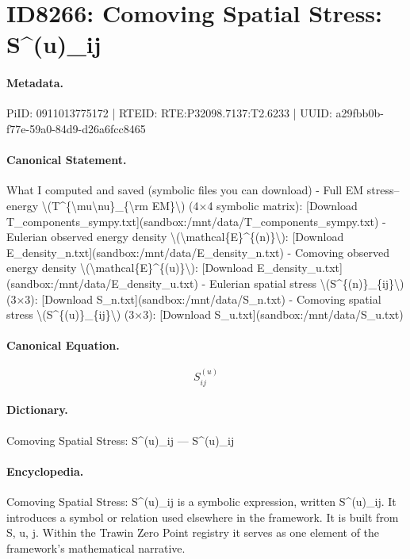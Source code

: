 \section*{ID8266: Comoving Spatial Stress: S\textasciicircum{}(u)\_ij}
\paragraph{Metadata.}
PiID: 0911013775172 | RTEID: RTE:P32098.7137:T2.6233 | UUID: a29fbb0b-f77e-59a0-84d9-d26a6fcc8465

\paragraph{Canonical Statement.}
What I computed and saved (symbolic files you can download) - Full EM stress–energy \textbackslash{}(T\textasciicircum{}\{\textbackslash{}mu\textbackslash{}nu\}\_\{\textbackslash{}rm EM\}\textbackslash{}) (4×4 symbolic matrix): [Download T\_components\_sympy.txt](sandbox:/mnt/data/T\_components\_sympy.txt) - Eulerian observed energy density \textbackslash{}(\textbackslash{}mathcal\{E\}\textasciicircum{}\{(n)\}\textbackslash{}): [Download E\_density\_n.txt](sandbox:/mnt/data/E\_density\_n.txt) - Comoving observed energy density \textbackslash{}(\textbackslash{}mathcal\{E\}\textasciicircum{}\{(u)\}\textbackslash{}): [Download E\_density\_u.txt](sandbox:/mnt/data/E\_density\_u.txt) - Eulerian spatial stress \textbackslash{}(S\textasciicircum{}\{(n)\}\_\{ij\}\textbackslash{}) (3×3): [Download S\_n.txt](sandbox:/mnt/data/S\_n.txt) - Comoving spatial stress \textbackslash{}(S\textasciicircum{}\{(u)\}\_\{ij\}\textbackslash{}) (3×3): [Download S\_u.txt](sandbox:/mnt/data/S\_u.txt)

\paragraph{Canonical Equation.}
\[
S^{(u)}_{ij}
\]

\paragraph{Dictionary.}
Comoving Spatial Stress: S\textasciicircum{}(u)\_ij — S\textasciicircum{}(u)\_ij

\paragraph{Encyclopedia.}
Comoving Spatial Stress: S\textasciicircum{}(u)\_ij is a symbolic expression, written S\textasciicircum{}(u)\_ij. It introduces a symbol or relation used elsewhere in the framework. It is built from S, u, j. Within the Trawin Zero Point registry it serves as one element of the framework's mathematical narrative.
